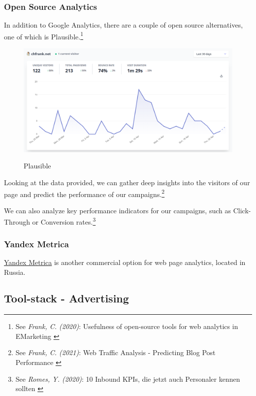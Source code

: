 \subsubsection{Open Source Analytics}

In addition to Google Analytics, there are a couple of open source alternatives, one of which is Plausible.\footnote{See \textit{Frank, C. (2020)}: Usefulness of open-source tools for web analytics in EMarketing \cite{previousPaper}} 

\begin{figure}[H]
\centering
\caption {Plausible}
\includegraphics[width=\linewidth]{images/plausible.png}
\label{fig:plausible}
\end{figure}

Looking at the data provided, we can gather deep insights into the visitors of our page and predict the performance of our campaigns.\footnote{See \textit{Frank, C. (2021)}: Web Traffic Analysis - Predicting Blog Post Performance \cite{previousBigdata}}

We can also analyze key performance indicators for our campaigns, such as Click-Through or Conversion rates.\footnote{See \textit{Romes, Y. (2020)}: 10 Inbound KPIs, die jetzt auch Personaler kennen sollten \cite{inboundKPI}}

\subsubsection{Yandex Metrica}

\href{https://metrica.yandex.com/}{Yandex Metrica} is another commercial option for web page analytics, located in Russia.

\subsection{Tool-stack - Advertising}


